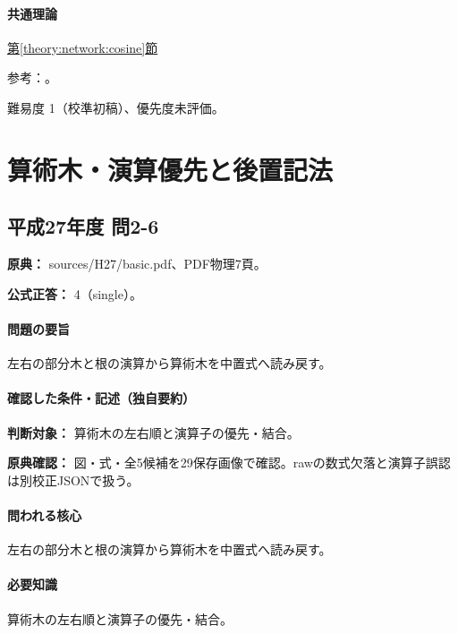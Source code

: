 \paragraph{共通理論} \hyperref[theory:network:cosine]{第\ref*{theory:network:cosine}節}

\par 参考：\cite{net_cosine}。

\par 難易度 1（校準初稿）、優先度未評価。

\section{算術木・演算優先と後置記法}

\subsection{平成27年度 問2-6}
\label{q:h27-reg-basic-2-6}

\noindent\textbf{原典：} sources/H27/basic.pdf、PDF物理7頁。

\textbf{公式正答：} 4（single）。

\paragraph{問題の要旨} 左右の部分木と根の演算から算術木を中置式へ読み戻す。

\paragraph{確認した条件・記述（独自要約）}\mbox{}\par

\noindent\textbf{判断対象：} 算術木の左右順と演算子の優先・結合。\par

\noindent\textbf{原典確認：} 図・式・全5候補を29保存画像で確認。rawの数式欠落と演算子誤認は別校正JSONで扱う。\par

\paragraph{問われる核心} 左右の部分木と根の演算から算術木を中置式へ読み戻す。

\paragraph{必要知識} 算術木の左右順と演算子の優先・結合。

